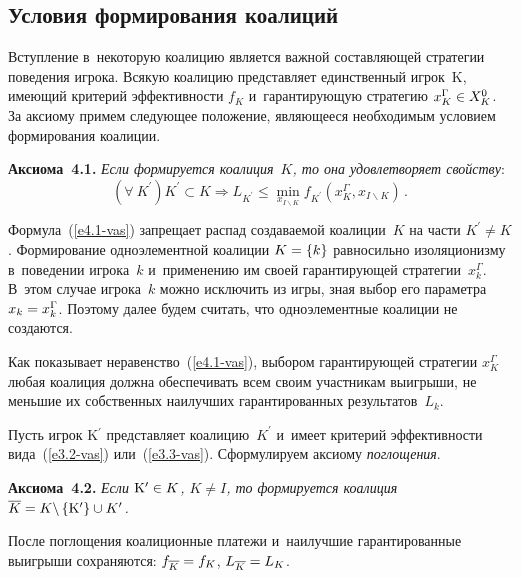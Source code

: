 \begin{multicols}{2}
\section{Условия формирования коалиций }

    Вступление в~некоторую коалицию является важной составляющей стратегии
поведения игрока. Всякую коалицию представляет единственный игрок~K,
имеющий критерий эффективности $f_K$ и~гарантирующую стратегию
$x_K^\Gamma\hm\in X_K^0$. За аксиому примем следующее положение,
являющееся необходимым условием формирования коалиции.

    \smallskip

    \noindent
    \textbf{Аксиома~4.1.} \textit{Если формируется коалиция~$K$, то она
удовлетворяет свойству}:
    \begin{equation}
    (\forall\ K^\prime) K^\prime   \subset K\Rightarrow L_{K^\prime} \leq
\min\limits_{x_{I\backslash K}} f_{K^\prime} \left( x_K^\Gamma, x_{I\backslash
K}\right)\,.
    \label{e4.1-vas}
    \end{equation}

Формула~(\ref{e4.1-vas}) запрещает распад создаваемой коалиции~$K$ на части
$K^\prime\not= K$. Формирование одноэлементной коалиции $K\hm= \{k\}$
равносильно изоляционизму в~поведении игрока~$k$ и~применению им своей
гарантирующей стратегии~$x_k^\Gamma$. В~этом случае игрока~$k$ можно
исключить из игры, зная выбор его параметра $x_k\hm= x_k^\Gamma$. Поэтому далее
будем считать, что одноэлементные коалиции не создаются.

    Как показывает неравенство~(\ref{e4.1-vas}), выбором гарантирующей
стратегии $x_K^\Gamma$ любая коалиция должна обеспечивать всем своим
участникам выигрыши, не меньшие их собственных наилучших гарантированных
результатов~$L_k$.

    Пусть игрок K$^\prime$ представляет коалицию~$K^\prime$ и~имеет критерий
эффективности вида~(\ref{e3.2-vas}) или~(\ref{e3.3-vas}). Сформулируем аксиому
\textit{поглощения}.

    \smallskip

    \noindent
    \textbf{Аксиома~4.2.} \textit{Если $\mathrm{K}^\prime\hm\in K$, $K\not= I$, то
формируется коалиция $\overline{K}\hm= K\backslash \left\{ \mathrm{K}^\prime\right\} \cup
K^\prime$.}

    \smallskip
    После поглощения коалиционные платежи и~наилучшие гарантированные
выигрыши сохраняются: $f_{\overline{K}}\hm= f_K$, $L_{\overline{K}}\hm= L_K$.

    \smallskip


\end{multicols}
